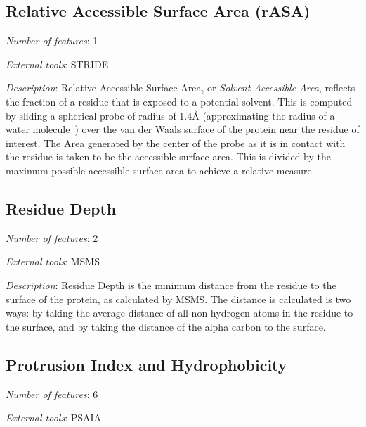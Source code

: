 \subsection{Relative Accessible Surface Area (rASA)}
\noindent
\emph{Number of features}: 1

\noindent
\emph{External tools}: STRIDE~\cite{heinig2004}

\noindent
\emph{Description}:
Relative Accessible Surface Area, or \emph{Solvent Accessible Area}, reflects the fraction of a residue that is exposed to a potential solvent.
This is computed by sliding a spherical probe of radius of 1.4\AA{} (approximating the radius of a water molecule~\cite{eisenhaber1995}) over the van der Waals surface of the protein near the residue of interest.
The Area generated by the center of the probe as it is in contact with the residue is taken to be the accessible surface area.
This is divided by the maximum possible accessible surface area to achieve a relative measure.


\subsection{Residue Depth}
\noindent
\emph{Number of features}: 2

\noindent
\emph{External tools}: MSMS~\cite{sanner1996}

\noindent
\emph{Description}:
Residue Depth is the minimum distance from the residue to the surface of the protein, as calculated by MSMS.
The distance is calculated is two ways: by taking the average distance of all non-hydrogen atoms in the residue to the surface, and by taking the distance of the alpha carbon to the surface.


\subsection{Protrusion Index and Hydrophobicity}
\noindent
\emph{Number of features}: 6

\noindent
\emph{External tools}: PSAIA~\cite{mihel2008}


